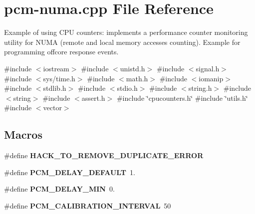 \section{pcm-\/numa.cpp File Reference}
\label{pcm-numa_8cpp}


Example of using C\+PU counters\+: implements a performance counter monitoring utility for N\+U\+MA (remote and local memory accesses counting). Example for programming offcore response events.  


{\ttfamily \#include $<$iostream$>$}\newline
{\ttfamily \#include $<$unistd.\+h$>$}\newline
{\ttfamily \#include $<$signal.\+h$>$}\newline
{\ttfamily \#include $<$sys/time.\+h$>$}\newline
{\ttfamily \#include $<$math.\+h$>$}\newline
{\ttfamily \#include $<$iomanip$>$}\newline
{\ttfamily \#include $<$stdlib.\+h$>$}\newline
{\ttfamily \#include $<$stdio.\+h$>$}\newline
{\ttfamily \#include $<$string.\+h$>$}\newline
{\ttfamily \#include $<$string$>$}\newline
{\ttfamily \#include $<$assert.\+h$>$}\newline
{\ttfamily \#include \char`\"{}cpucounters.\+h\char`\"{}}\newline
{\ttfamily \#include \char`\"{}utils.\+h\char`\"{}}\newline
{\ttfamily \#include $<$vector$>$}\newline
\subsection*{Macros}
\begin{DoxyCompactItemize}
\item 
\mbox{\label{pcm-numa_8cpp_ac4eeb11d89b0f517835a12a04443ebe4}} 
\#define {\bfseries H\+A\+C\+K\+\_\+\+T\+O\+\_\+\+R\+E\+M\+O\+V\+E\+\_\+\+D\+U\+P\+L\+I\+C\+A\+T\+E\+\_\+\+E\+R\+R\+OR}
\item 
\mbox{\label{pcm-numa_8cpp_aa9ecc55c90c7a69729babc4f5f91ed96}} 
\#define {\bfseries P\+C\+M\+\_\+\+D\+E\+L\+A\+Y\+\_\+\+D\+E\+F\+A\+U\+LT}~1.
\item 
\mbox{\label{pcm-numa_8cpp_acccbe8441d6dd75bdc949f5f0ee126c5}} 
\#define {\bfseries P\+C\+M\+\_\+\+D\+E\+L\+A\+Y\+\_\+\+M\+IN}~0.
\item 
\mbox{\label{pcm-numa_8cpp_a433dde946b6713059756318598c9a6fe}} 
\#define {\bfseries P\+C\+M\+\_\+\+C\+A\+L\+I\+B\+R\+A\+T\+I\+O\+N\+\_\+\+I\+N\+T\+E\+R\+V\+AL}~50
\end{DoxyCompactItemize}
